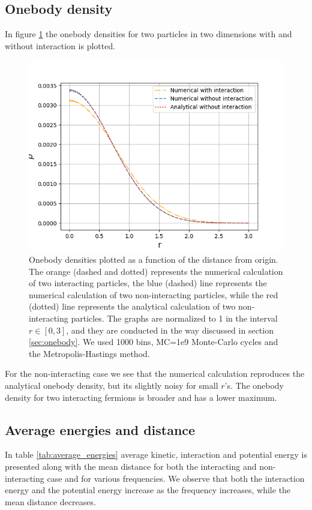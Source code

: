 \documentclass[norsk,a4paper,12pt]{article}
\begin{document}
\subsection{Onebody density}
In figure \ref{fig:OB} the onebody densities for two particles in two dimensions with and without interaction is plotted.
 \begin{figure} [H]
 	\centering
 	\includegraphics[scale=0.8]{plots/OB_comparison_MC_1e9.png}
 	\caption{Onebody densities plotted as a function of the distance from origin. The orange (dashed and dotted) represents the numerical calculation of two interacting particles, the blue (dashed) line represents the numerical calculation of two non-interacting particles, while the red (dotted) line represents the analytical calculation of two non-interacting particles. The graphs are normalized to 1 in the interval $r\in[0,3]$, and they are conducted in the way discussed in section \ref{sec:onebody}. We used 1000 bins, MC=1e9 Monte-Carlo cycles and the Metropolis-Hastings method.}
 	\label{fig:OB}
 \end{figure}
For the non-interacting case we see that the numerical calculation reproduces the analytical onebody density, but its slightly noisy for small $r$'s. The onebody density for two interacting fermions is broader and has a lower maximum.
 

\subsection{Average energies and distance}
In table \ref{tab:average_energies} average kinetic, interaction and potential energy is presented along with the mean distance for both the interacting and non-interacting case and for various frequencies. We observe that both the interaction energy and the potential energy increase as the frequency increases, while the mean distance decreases.
\end{document}
